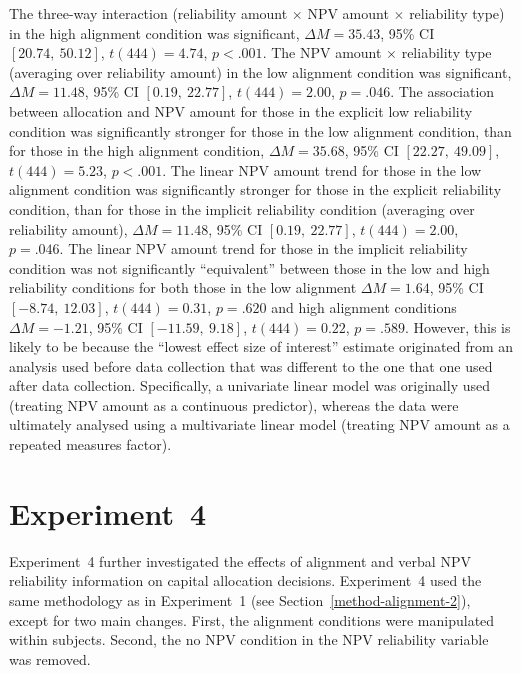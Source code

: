 \documentclass[a4paper, nobind, dvipsnames]{templates/ociamthesis}
\theoremstyle{definition}
\theoremstyle{definition}
\theoremstyle{definition}
\theoremstyle{definition}
\theoremstyle{remark}
\begin{document}
The three-way interaction
(reliability amount \(\times\) NPV amount \(\times\) reliability type) in the high
alignment condition was significant,
\(\Delta M = 35.43\), 95\% CI \([20.74,~50.12]\), \(t(444) = 4.74\), \(p < .001\). The NPV amount
\(\times\) reliability type (averaging over reliability amount) in the low
alignment condition was significant,
\(\Delta M = 11.48\), 95\% CI \([0.19,~22.77]\), \(t(444) = 2.00\), \(p = .046\). The association
between allocation and NPV amount for those in the explicit low reliability
condition was significantly stronger for those in the low alignment condition,
than for those in the high alignment condition,
\(\Delta M = 35.68\), 95\% CI \([22.27,~49.09]\), \(t(444) = 5.23\), \(p < .001\).
The linear NPV amount trend for those in the low alignment condition was
significantly stronger for those in the explicit reliability condition, than for
those in the implicit reliability condition (averaging over reliability amount),
\(\Delta M = 11.48\), 95\% CI \([0.19,~22.77]\), \(t(444) = 2.00\), \(p = .046\). The linear
NPV amount trend for those in the implicit reliability condition was not
significantly ``equivalent'' between those in the low and high reliability
conditions for both those in the low alignment
\(\Delta M = 1.64\), 95\% CI \([-8.74,~12.03]\), \(t(444) = 0.31\), \(p = .620\)
and high alignment conditions
\(\Delta M = -1.21\), 95\% CI \([-11.59,~9.18]\), \(t(444) = 0.22\), \(p = .589\).
However, this is likely to be because the ``lowest effect size of interest''
estimate originated from an analysis used before data collection that was
different to the one that one used after data collection. Specifically, a
univariate linear model was originally used (treating NPV amount as a continuous
predictor), whereas the data were ultimately analysed using a multivariate
linear model (treating NPV amount as a repeated measures factor).

\hypertarget{alignment-1}{%
\section{Experiment~4}\label{alignment-1}}

Experiment~4 further investigated the effects of alignment and verbal NPV
reliability information on capital allocation decisions. Experiment~4 used the
same methodology as in Experiment~1 (see Section~\ref{method-alignment-2}),
except for two main changes. First, the alignment conditions were manipulated
within subjects. Second, the no NPV condition in the NPV reliability variable
was removed.
\end{document}
